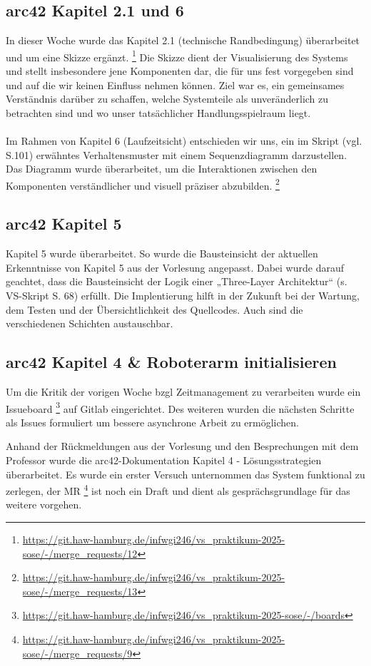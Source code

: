 \documentclass{article}
\begin{document}
\subsection{arc42 Kapitel 2.1 und 6}
In dieser Woche wurde das Kapitel 2.1 (technische Randbedingung) überarbeitet und um eine Skizze ergänzt.
 \footnote{\url {https://git.haw-hamburg.de/infwgi246/vs_praktikum-2025-sose/-/merge_requests/12}}
Die Skizze dient der Visualisierung des Systems und stellt insbesondere jene Komponenten dar, die für uns fest vorgegeben sind und auf die wir keinen Einfluss nehmen können.
Ziel war es, ein gemeinsames Verständnis darüber zu schaffen, welche Systemteile als unveränderlich zu betrachten sind und wo unser tatsächlicher Handlungsspielraum liegt.
\\\\
Im Rahmen von Kapitel 6 (Laufzeitsicht) entschieden wir uns, ein im Skript (vgl. S.101) erwähntes Verhaltensmuster mit einem Sequenzdiagramm darzustellen.
Das Diagramm wurde überarbeitet, um die Interaktionen zwischen den Komponenten verständlicher und visuell präziser abzubilden.
\footnote{\url {https://git.haw-hamburg.de/infwgi246/vs_praktikum-2025-sose/-/merge_requests/13}}




\subsection{arc42 Kapitel 5}
Kapitel 5 wurde überarbeitet.
So wurde die Bausteinsicht der aktuellen Erkenntnisse von Kapitel 5 aus der Vorlesung angepasst. 
Dabei wurde darauf geachtet, dass die Bausteinsicht der Logik einer „Three-Layer Architektur“ (s. VS-Skript S. 68) erfüllt.
Die Implentierung hilft in der Zukunft bei der Wartung, dem Testen und der Übersichtlichkeit des Quellcodes. Auch sind die verschiedenen Schichten austauschbar.

\subsection{arc42 Kapitel 4 \& Roboterarm initialisieren} 
Um die Kritik der vorigen Woche bzgl Zeitmanagement zu verarbeiten wurde ein Issueboard
\footnote{\url{https://git.haw-hamburg.de/infwgi246/vs_praktikum-2025-sose/-/boards}}
auf Gitlab eingerichtet. Des weiteren wurden die nächsten Schritte als Issues formuliert 
um bessere asynchrone Arbeit zu ermöglichen. 

Anhand der Rückmeldungen aus der Vorlesung und den Besprechungen mit dem Professor wurde die arc42-Dokumentation Kapitel 4 - Lösungsstrategien überarbeitet.
Es wurde ein erster Versuch unternommen das System funktional zu zerlegen, der MR
\footnote{\url{https://git.haw-hamburg.de/infwgi246/vs_praktikum-2025-sose/-/merge_requests/9}}
ist noch ein Draft und dient als gesprächsgrundlage für das weitere vorgehen. 
\end{document}
